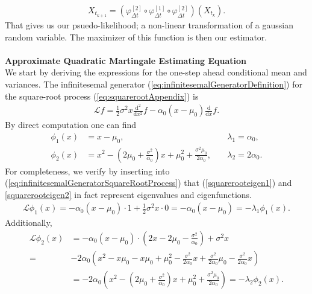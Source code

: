 \begin{align}
    X_{t_{k + 1}} = \left(\varphi_{\Delta t}^{[2]} \circ \varphi_{\Delta t}^{[1]} \circ \varphi_{\Delta t}^{[2]}\right)\left(X_{t_k}\right).
\end{align}
That gives us our psuedo-likelihood; a non-linear transformation of a gaussian random variable. The maximizer of this function is then our estimator. \\\\
\noindent \textbf{Approximate Quadratic Martingale Estimating Equation}\\
We start by deriving the expressions for the one-step ahead conditional mean and variances. The infinitesemal generator (\ref{eq:infinitesemalGeneratorDefinition}) for the square-root process (\ref{eq:squarerootAppendix}) is 
\begin{align}
    \mathcal{L}f = \frac{1}{2}\sigma^2x\frac{\mathrm{d^2}}{\mathrm{d}x^2}f -\alpha_0\left(x - \mu_0\right)\frac{\mathrm{d}}{\mathrm{d}x}f. \label{eq:infinitesemalGeneratorSquareRootProcess}
\end{align}
By direct computation one can find 
\begin{align}
    \phi_1(x) &= x-\mu_0, &&\; \lambda_1 = \alpha_0, \label{squarerooteigen1}\\
    \phi_2(x) &= x^2 - \left(2\mu_0 + \frac{\sigma^2}{\alpha_0}\right)x + \mu_0^2 + \frac{\sigma^2\mu_0}{2\alpha_0}, &&\; \lambda_2 = 2\alpha_0. \label{squarerooteigen2}
\end{align}
For completeness, we verify by inserting into (\ref{eq:infinitesemalGeneratorSquareRootProcess}) that (\ref{squarerooteigen1}) and \ref{squarerooteigen2} in fact represent eigenvalues and eigenfunctions.
\begin{align}
    \mathcal{L}\phi_1(x) = -\alpha_0\left(x - \mu_0\right)\cdot 1 + \frac{1}{2}\sigma^2 x \cdot 0 = -\alpha_0\left(x - \mu_0\right) = -\lambda_1\phi_1(x). \label{eq:directVerificationCondMean}
\end{align}
Additionally,
\begin{align}
    \mathcal{L}\phi_2(x) &= -\alpha_0\left(x - \mu_0\right)\cdot \left(2x -2\mu_0 - \frac{\sigma^2}{\alpha_0}\right) + \sigma^2x\\
    =& -2\alpha_0\left(x^2-x\mu_0 - x\mu_0 + \mu_0^2 -\frac{\sigma^2}{2\alpha_0}x + \frac{\sigma^2}{2\alpha_0}\mu_0 - \frac{\sigma^2}{2\alpha_0}x \right)\\
    &= -2\alpha_0 \left(x^2 -\left(2\mu_0+\frac{\sigma^2}{\alpha_0}\right)x + \mu_0^2 + \frac{\sigma^2\mu_0}{2\alpha_0}\right) = -\lambda_2\phi_2(x).\\
\end{align}
